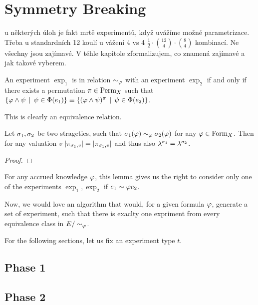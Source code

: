 \section{Symmetry Breaking}

 u některých úloh je fakt mrtě experimentů, když uvážíme možné
parametrizace. Třeba u standardních 12 koulí u vážení 4 vs 4
 $\frac{1}{2}\cdot {12 \choose 4}\cdot{8 \choose 4}$ kombinací. Ne všechny jsou zajímavé.
V téhle kapitole zformalizujem, co znamená zajímavé a jak takové vyberem.

\begin{definition}
An experiment $\exp_1$ is in relation $\sim_\varphi$ with an experiment $\exp_2$ if
 and only if there exists a permutation $\pi\in\textrm{Perm}_X$ such that
 $ \{ \varphi\wedge\psi \:\:|\:\: \psi\in\Phi(e_1) \} \equiv
   \{ (\varphi\wedge\psi)^\pi \:\:|\:\: \psi\in\Phi(e_2) \} $.
\end{definition}

This is clearly an equivalence relation.

\begin{lemma}
Let $\sigma_1, \sigma_2$ be two strageties, such that
$\sigma_1(\varphi) \sim_\varphi \sigma_2(\varphi)$ for any $\varphi \in\textrm{Form}_X$.
Then for any valuation $v$ $|\pi_{\sigma_1,v}| = |\pi_{\sigma_1,v}|$
and thus also $\lambda^{\sigma_1} = \lambda^{\sigma_2}$.
\end{lemma}

\begin{proof}
\end{proof}

For any accrued knowledge $\varphi$, this lemma gives us the right
to consider only one of the experiments
$\exp_1, \exp_2$ if $e_1 \sim\varphi e_2$.

Now, we would love an algorithm that would, for a given formula $\varphi$,
generate a set of experiment, such that there is exaclty one expriment
from every equivalence class in $E/\sim_\varphi$.

For the following sections, let us fix an experiment type $t$.
\subsection{Phase 1}

\subsection{Phase 2}